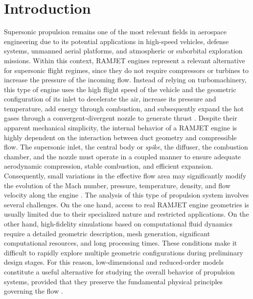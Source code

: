 \documentclass[preprint,12pt]{elsarticle}
\begin{document}
\section{Introduction}
\label{sec:introduction}
Supersonic propulsion remains one of the most relevant fields in aerospace engineering due to its potential applications in high-speed vehicles, defense systems, unmanned aerial platforms, and atmospheric or suborbital exploration missions. Within this context, RAMJET engines represent a relevant alternative for supersonic flight regimes, since they do not require compressors or turbines to increase the pressure of the incoming flow. Instead of relying on turbomachinery, this type of engine uses the high flight speed of the vehicle and the geometric configuration of its inlet to decelerate the air, increase its pressure and temperature, add energy through combustion, and subsequently expand the hot gases through a convergent-divergent nozzle to generate thrust \cite{Hill1992,Mattingly2006,NASA2015}.
Despite their apparent mechanical simplicity, the internal behavior of a RAMJET engine is highly dependent on the interaction between duct geometry and compressible flow. The supersonic inlet, the central body or \textit{spike}, the diffuser, the combustion chamber, and the nozzle must operate in a coupled manner to ensure adequate aerodynamic compression, stable combustion, and efficient expansion. Consequently, small variations in the effective flow area may significantly modify the evolution of the Mach number, pressure, temperature, density, and flow velocity along the engine \cite{Anderson1990,Heiser1994}.
The analysis of this type of propulsion system involves several challenges. On the one hand, access to real RAMJET engine geometries is usually limited due to their specialized nature and restricted applications. On the other hand, high-fidelity simulations based on computational fluid dynamics require a detailed geometric description, mesh generation, significant computational resources, and long processing times. These conditions make it difficult to rapidly explore multiple geometric configurations during preliminary design stages. For this reason, low-dimensional and reduced-order models constitute a useful alternative for studying the overall behavior of propulsion systems, provided that they preserve the fundamental physical principles governing the flow \cite{Bayona2019,Burden2011}.
\end{document}
